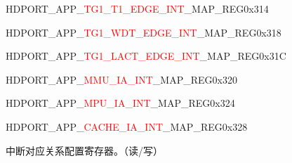 \vspace{-3em}\begin{register}{H}{DPORT\_APP\_\textcolor{red}{TG1\_T1\_EDGE\_INT}\_MAP\_REG}{0x314}\label{regdesc:APPTG1T1EDGEINTMAPREG}
\end{register}
\vspace{-3em}
\begin{register}{H}{DPORT\_APP\_\textcolor{red}{TG1\_WDT\_EDGE\_INT}\_MAP\_REG}{0x318}\label{regdesc:APPTG1WDTEDGEINTMAPREG}
\end{register}
\vspace{-3em}
\begin{register}{H}{DPORT\_APP\_\textcolor{red}{TG1\_LACT\_EDGE\_INT}\_MAP\_REG}{0x31C}\label{regdesc:APPTG1LACTEDGEINTMAPREG}
\end{register}
\vspace{-3em}
\begin{register}{H}{DPORT\_APP\_\textcolor{red}{MMU\_IA\_INT}\_MAP\_REG}{0x320}\label{regdesc:APPMMUIAINTMAPREG}
\end{register}
\vspace{-3em}
\begin{register}{H}{DPORT\_APP\_\textcolor{red}{MPU\_IA\_INT}\_MAP\_REG}{0x324}\label{regdesc:APPMPUIAINTMAPREG}
\end{register}
\vspace{-3em}
\begin{register}{H}{DPORT\_APP\_\textcolor{red}{CACHE\_IA\_INT}\_MAP\_REG}{0x328}\label{regdesc:APPCACHEIAINTMAPREG}
%
%
\regnewline%
\begin{regdesc}\begin{reglist}
\item [DPORT\_APP\_\textcolor{red}{*}\_MAP]中断对应关系配置寄存器。（读/写）
\end{reglist}\end{regdesc}
\end{register}


